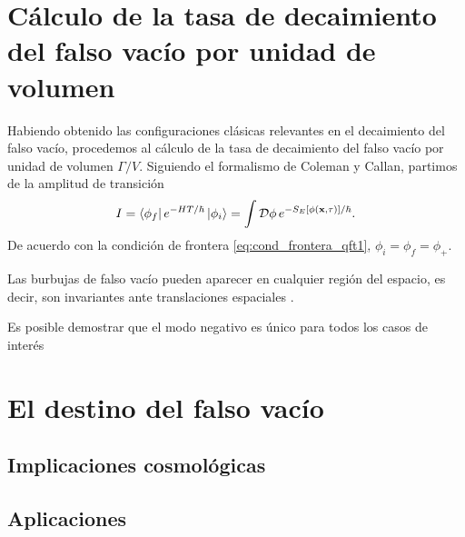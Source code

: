 \section{Cálculo de la tasa de decaimiento del falso vacío por unidad de volumen}

Habiendo obtenido las configuraciones clásicas relevantes en el decaimiento del falso vacío, procedemos al cálculo de la tasa de decaimiento del falso vacío por unidad de volumen $\Gamma/V$. Siguiendo el formalismo de Coleman y Callan, partimos de la amplitud de transición 
\begin{equation}
I = \bra{\phi_f}e^{-HT/\hbar}\ket{\phi_i} = \int \mathcal{D}\phi \, e^{-S_E\qty[\phi\qty(\vb{x},\tau)]/\hbar}.
\end{equation}
De acuerdo con la condición de frontera \eqref{eq:cond_frontera_qft1}, $\phi_i = \phi_f = \phi_+$.

Las burbujas de falso vacío pueden aparecer en cualquier región del espacio, es decir, son invariantes ante translaciones espaciales \cite{coleman1977fate}. 

Es posible demostrar que el modo negativo es único para todos los casos de interés \cite{coleman1977fate, coleman1988quantum}

\section{El destino del falso vacío}

\subsection{Implicaciones cosmológicas}

\subsection{Aplicaciones}